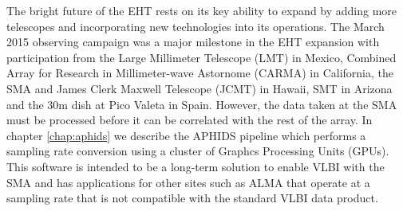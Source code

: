 The bright future of the EHT rests on its key ability to expand by adding more telescopes and
incorporating new technologies into its operations.  The March 2015 observing campaign was a major milestone in
the EHT expansion with participation from the Large Millimeter Telescope (LMT) in Mexico, Combined Array for 
Research in Millimeter-wave Astornome (CARMA) in California, the SMA and James Clerk Maxwell Telescope (JCMT) in
 Hawaii, SMT in Arizona and the 30m dish at Pico Valeta in Spain.  However, the data taken at the SMA must be processed before it
can be correlated with the rest of the array.  In chapter \ref{chap:aphids} we describe the APHIDS pipeline
which performs a sampling rate conversion using a cluster of Graphcs Processing Units (GPUs).  This software
is intended to be a long-term solution to enable VLBI with the SMA and has applications for other sites such 
as ALMA that operate at a sampling rate that is not compatible with the standard VLBI data product.
